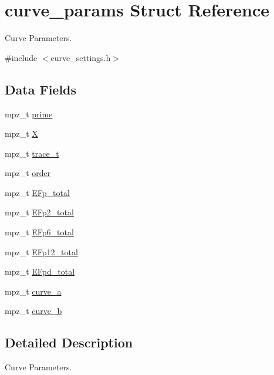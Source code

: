 \hypertarget{structcurve__params}{}\section{curve\+\_\+params Struct Reference}
\label{structcurve__params}


Curve Parameters.  




{\ttfamily \#include $<$curve\+\_\+settings.\+h$>$}

\subsection*{Data Fields}
\begin{DoxyCompactItemize}
\item 
mpz\+\_\+t \hyperlink{structcurve__params_aba84e227126f9481f3f1a07737f563c2}{prime}
\item 
mpz\+\_\+t \hyperlink{structcurve__params_aafd3c8facd30604e0786d7d2885f373d}{X}
\item 
mpz\+\_\+t \hyperlink{structcurve__params_a92e90157be25b87a0cd9d55883664fdf}{trace\+\_\+t}
\item 
mpz\+\_\+t \hyperlink{structcurve__params_aead4939b8a895eace7b64a9567e02627}{order}
\item 
mpz\+\_\+t \hyperlink{structcurve__params_a6bf91dafda4f4779069da69efe4a7550}{E\+Fp\+\_\+total}
\item 
mpz\+\_\+t \hyperlink{structcurve__params_a41f2c250bbb645f79e140a0cc74841ce}{E\+Fp2\+\_\+total}
\item 
mpz\+\_\+t \hyperlink{structcurve__params_a648289a78c013a2fa6cb7411f4feadce}{E\+Fp6\+\_\+total}
\item 
mpz\+\_\+t \hyperlink{structcurve__params_a0bd24fe1a201e15d394f94b54fffed73}{E\+Fp12\+\_\+total}
\item 
mpz\+\_\+t \hyperlink{structcurve__params_a5a7b670d8ea5bf30cda27dc5b14096ab}{E\+Fpd\+\_\+total}
\item 
mpz\+\_\+t \hyperlink{structcurve__params_a76692630dc7e9637262e95fe0189cd9d}{curve\+\_\+a}
\item 
mpz\+\_\+t \hyperlink{structcurve__params_a69f572611e84fdb672a5042ddc78bb84}{curve\+\_\+b}
\end{DoxyCompactItemize}


\subsection{Detailed Description}
Curve Parameters. 


